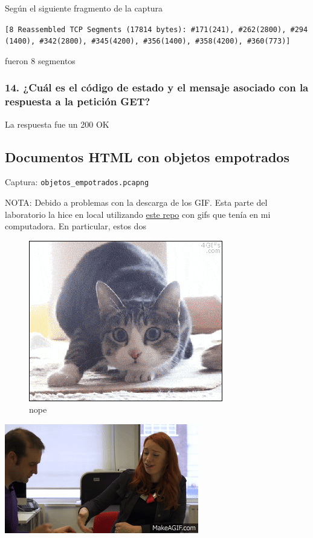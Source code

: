\documentclass[11pt]{article}
\makeatletter
\def\maxwidth{\ifdim\Gin@nat@width>\linewidth\linewidth
    \else\Gin@nat@width\fi}
\let\Oldincludegraphics\includegraphics
\renewcommand{\includegraphics}[1]{\Oldincludegraphics[width=.8\maxwidth]{#1}}
\makeatother
\begin{document}
Según el siguiente fragmento de la captura

\texttt{{[}8\ Reassembled\ TCP\ Segments\ (17814\ bytes):\ \#171(241),\ \#262(2800),\ \#294(1400),\ \#342(2800),\ \#345(4200),\ \#356(1400),\ \#358(4200),\ \#360(773){]}}

fueron 8 segmentos

\hypertarget{cuuxe1l-es-el-cuxf3digo-de-estado-y-el-mensaje-asociado-con-la-respuesta-a-la-peticiuxf3n-get}{%
\subsubsection{14. ¿Cuál es el código de estado y el mensaje asociado
con la respuesta a la petición
GET?}\label{cuuxe1l-es-el-cuxf3digo-de-estado-y-el-mensaje-asociado-con-la-respuesta-a-la-peticiuxf3n-get}}

La respuesta fue un 200 OK

    \hypertarget{documentos-html-con-objetos-empotrados}{%
\subsection{Documentos HTML con objetos
empotrados}\label{documentos-html-con-objetos-empotrados}}

    Captura: \texttt{objetos\_empotrados.pcapng}

NOTA: Debido a problemas con la descarga de los GIF. Esta parte del
laboratorio la hice en local utilizando
\href{https://github.com/D3f0/unp-rtd-tp1}{este repo} con gifs que tenía
en mi computadora. En particular, estos dos

\begin{figure}
\centering
\includegraphics{funny-cat-gif-3.gif}
\caption{nope}
\end{figure}

\includegraphics{The_Mathematics_of_Winning_Monopoly.gif}
\end{document}
